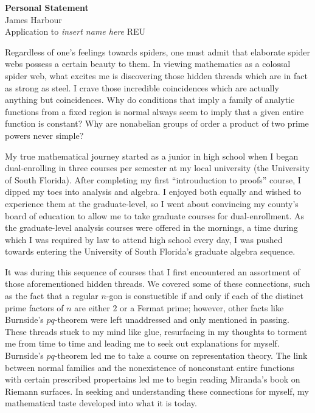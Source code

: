\documentclass[12pt]{article}
\begin{document}
\begin{center}
  \textbf{Personal Statement}\\
  James Harbour \\
  Application to \emph{insert name here} REU
\end{center}


Regardless of one's feelings towards spiders, one must admit that elaborate spider webs possess a certain beauty to them. In viewing mathematics as a colossal spider web, what excites me is discovering those hidden threads which are in fact as strong as steel. I crave those incredible coincidences which are actually anything but coincidences. Why do conditions that imply a family of analytic functions from a fixed region is normal always seem to imply that a given entire function is constant? Why are nonabelian groups of order a product of two prime powers never simple?








My true mathematical journey started as a junior in high school when I began dual-enrolling in three courses per semester at my local university (the University of South Florida). After completing my first ``introuduction to proofs'' course, I dipped my toes into analysis and algebra. I enjoyed both equally and wished to experience them at the graduate-level, so I went about convincing my county's board of education to allow me to take graduate courses for dual-enrollment. As the graduate-level analysis courses were offered in the mornings, a time during which I was required by law to attend high school every day, I was pushed towards entering the University of South Florida's graduate algebra sequence.

It was during this sequence of courses that I first encountered an assortment of those aforementioned hidden threads. We covered some of these connections, such as the fact that a regular $n$-gon is constuctible if and only if each of the distinct prime factors of $n$ are either $2$ or a Fermat prime; however, other facts like Burnside's $pq$-theorem were left unaddressed and only mentioned in passing. These threads stuck to my mind like glue, resurfacing in my thoughts to torment me from time to time and leading me to seek out explanations for myself. Burnside's $pq$-theorem led me to take a course on representation theory. The link between normal families and the nonexistence of nonconstant entire functions with certain prescribed propertains led me to begin reading Miranda's book on Riemann surfaces. In seeking and understanding these connections for myself, my mathematical taste developed into what it is today.
\end{document}
